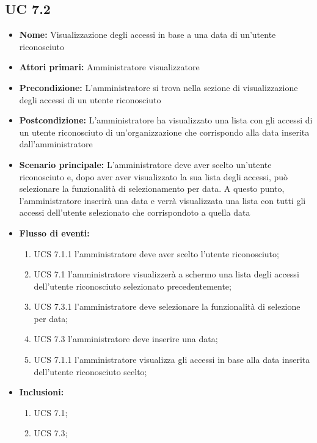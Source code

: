 \subsection{UC 7.2}%
\begin{itemize}
	\item \textbf{Nome:} Visualizzazione degli accessi in base a una data di un'utente riconosciuto
	\item \textbf{Attori primari:} Amministratore visualizzatore
	\item \textbf{Precondizione:} L'amministratore si trova nella sezione di visualizzazione degli accessi di un utente riconosciuto
	\item \textbf{Postcondizione:} L'amministratore ha visualizzato una lista con gli accessi di un utente riconosciuto di un'organizzazione che corrispondo alla data inserita dall'amministratore
	\item \textbf{Scenario principale:} L'amministratore deve aver scelto un'utente riconosciuto e, dopo aver aver visualizzato la sua lista degli accessi, può selezionare la funzionalità di selezionamento per data. A questo punto, l'amministratore inserirà una data e verrà visualizzata una lista con tutti gli accessi dell'utente selezionato che corrispondoto a quella data
	\item \textbf{Flusso di eventi:} 
	\begin{enumerate}
		\item UCS 7.1.1 l'amministratore deve aver scelto l'utente riconosciuto;
		\item UCS 7.1 l'amministratore visualizzerà a schermo una lista degli accessi dell'utente riconosciuto selezionato precedentemente;
		\item UCS 7.3.1 l'amministratore deve selezionare la funzionalità di selezione per data;
		\item UCS 7.3 l'amministratore deve inserire una data;
		\item UCS 7.1.1 l'amministratore visualizza gli accessi in base alla data inserita dell'utente riconosciuto scelto;
	\end{enumerate}
	\item \textbf{Inclusioni:}
	\begin{enumerate}
		\item UCS 7.1;
		\item UCS 7.3;
	\end{enumerate}
\end{itemize}

